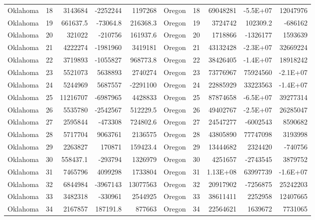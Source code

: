 \begin{table}[]
\begin{tabular}{lrrrrlrrrr}
		Oklahoma &  18 & 3143684 & -2252244 & 1197268 & Oregon &  18 & 69048281 & -5.5E+07 & 12047976 \\
		Oklahoma &  19 & 661637.5 & -73064.8 & 216368.3 & Oregon &  19 & 3724742 & 102309.2 & -686162 \\
		Oklahoma &  20 & 321022 & -210756 & 161937.6 & Oregon &  20 & 1718866 & -1326177 & 1593639 \\
		Oklahoma &  21 & 4222274 & -1981960 & 3419181 & Oregon &  21 & 43132428 & -2.3E+07 & 32669224 \\
		Oklahoma &  22 & 3719893 & -1055827 & 968773.8 & Oregon &  22 & 38426405 & -1.4E+07 & 18918242 \\
		Oklahoma &  23 & 5521073 & 5638893 & 2740274 & Oregon &  23 & 73776967 & 75924560 & -2.1E+07 \\
		Oklahoma &  24 & 5244969 & 5687557 & -2291100 & Oregon &  24 & 22885929 & 33223563 & -1.4E+07 \\
		Oklahoma &  25 & 11216707 & -6987965 & 4428833 & Oregon &  25 & 87874658 & -6.5E+07 & 39277314 \\
		Oklahoma &  26 & 5535780 & -2542567 & 512229.5 & Oregon &  26 & 49402767 & -2.5E+07 & 26285047 \\
		Oklahoma &  27 & 2595844 & -473308 & 724802.6 & Oregon &  27 & 24547277 & -6002543 & 8590682 \\
		Oklahoma &  28 & 5717704 & 9063761 & 2136575 & Oregon &  28 & 43805890 & 77747098 & 3193998 \\
		Oklahoma &  29 & 2263827 & 170871 & 159423.4 & Oregon &  29 & 13444682 & 2324420 & -740756 \\
		Oklahoma &  30 & 558437.1 & -293794 & 1326979 & Oregon &  30 & 4251657 & -2743545 & 3879752 \\
		Oklahoma &  31 & 7465796 & 4099298 & 1733804 & Oregon &  31 & 1.13E+08 & 63997739 & -1.6E+07 \\
		Oklahoma &  32 & 6844984 & -3967143 & 13077563 & Oregon &  32 & 20917902 & -7256875 & 25242203 \\
		Oklahoma &  33 & 3482318 & -330961 & 2544925 & Oregon &  33 & 38611411 & 2252958 & 12407665 \\
		Oklahoma &  34 & 2167857 & 187191.8 & 877663 & Oregon &  34 & 22564621 & 1639672 & 7731065
	\end{tabular}
\end{table}

